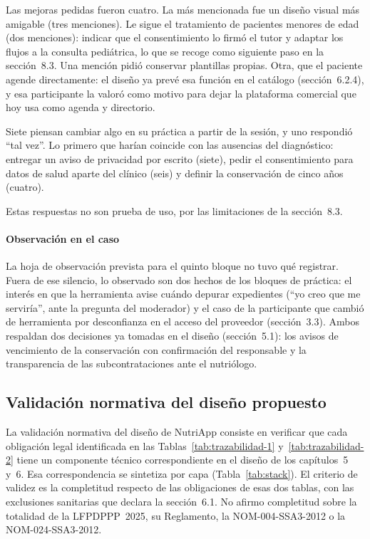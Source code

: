 \documentclass[12pt, a4paper]{article}
\begin{document}
Las mejoras pedidas fueron cuatro. La más mencionada fue un diseño
visual más amigable (tres menciones). Le sigue el tratamiento de
pacientes menores de edad (dos menciones): indicar que el consentimiento
lo firmó el tutor y adaptar los flujos a la consulta pediátrica, lo que
se recoge como siguiente paso en la sección~8.3. Una mención pidió
conservar plantillas propias. Otra, que el paciente agende directamente:
el diseño ya prevé esa función en el catálogo (sección~6.2.4), y esa
participante la valoró como motivo para dejar la plataforma comercial
que hoy usa como agenda y directorio.

Siete piensan cambiar algo en su práctica a partir de la sesión, y uno
respondió ``tal vez''. Lo primero que harían coincide con las ausencias
del diagnóstico: entregar un aviso de privacidad por escrito (siete),
pedir el consentimiento para datos de salud aparte del clínico (seis) y
definir la conservación de cinco años (cuatro).

Estas respuestas no son prueba de uso, por las limitaciones de la sección~8.3.

\paragraph{Observación en el caso}
La hoja de observación prevista para el quinto bloque no tuvo qué
registrar. Fuera de ese silencio, lo observado son dos hechos de los
bloques de práctica: el interés en que la herramienta avise cuándo
depurar expedientes (``yo creo que me serviría'', ante la pregunta del
moderador) y el caso de la participante que cambió de herramienta por desconfianza en el acceso del proveedor (sección~3.3). Ambos respaldan dos decisiones ya
tomadas en el diseño (sección~5.1): los avisos de vencimiento de la conservación con
confirmación del responsable y la transparencia de las
subcontrataciones ante el nutriólogo.
 

\subsection{Validación normativa del diseño propuesto}

La validación normativa del diseño de NutriApp consiste en verificar que
cada obligación legal identificada en las
Tablas~\ref{tab:trazabilidad-1} y~\ref{tab:trazabilidad-2} tiene un
componente técnico correspondiente en el diseño de los capítulos~5 y~6.
Esa correspondencia se sintetiza por capa (Tabla~\ref{tab:stack}). El criterio de
validez es la completitud respecto de las obligaciones de esas dos
tablas, con las exclusiones sanitarias que declara la sección~6.1. No afirmo completitud sobre la totalidad de la LFPDPPP~2025, su
Reglamento, la NOM-004-SSA3-2012 o la NOM-024-SSA3-2012.
 
\end{document}
